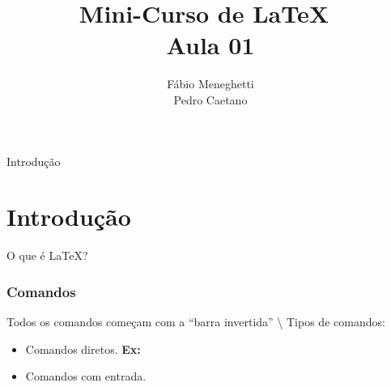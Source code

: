 \documentclass[12pt]{beamer}
\title{Mini-Curso de \LaTeX\ \\ Aula 01}
\author{Fábio Meneghetti\\
Pedro Caetano}
\date{}
\begin{document}
  \begin{frame}
    \titlepage
  \end{frame}

  \begin{frame}{Introdução}
    \section{Introdução}
    O que é \LaTeX?
  \end{frame}

  \begin{frame}[fragile]
    \frametitle{Comandos}
     Todos os comandos começam com a ``barra invertida'' \textbackslash
     Tipos de comandos:
     \begin{itemize}
       \item Comandos diretos. \textbf{Ex:}
       \item Comandos com entrada.
     \end{itemize}
  \end{frame}
\end{document}

